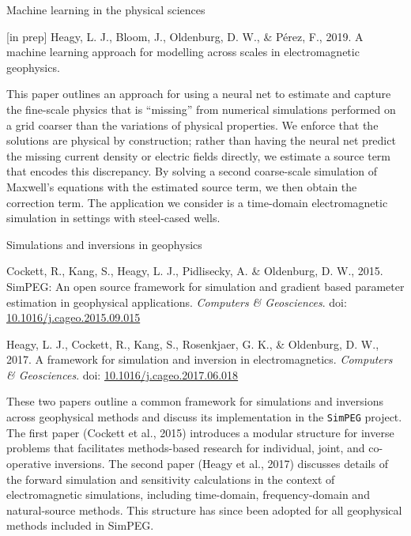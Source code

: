 \documentclass[a4paper, 11pt]{article}
\newcommand{\doi}[1]{doi: \href{https://doi.org/#1}{#1}}
\newcommand{\subheading}[1]{
    \vspace{0.4cm}
    {\Large #1}\\
    \vspace{-0.2cm}
}
\begin{document}
\subheading{Machine learning in the physical sciences}

\begin{myitemize}
    \item{[in prep] Heagy, L. J., Bloom, J., Oldenburg, D. W., \& P\'erez, F., 2019. A machine learning approach for modelling across scales in electromagnetic geophysics.}
\end{myitemize}

This paper outlines an approach for using a neural net to estimate and capture the fine-scale physics that is ``missing'' from numerical simulations performed on a grid coarser than the variations of physical properties.
We enforce that the solutions are physical by construction; rather than having the neural net predict the missing current density or electric fields directly, we estimate a source term that encodes this discrepancy.  By solving a second coarse-scale simulation of Maxwell's equations with the estimated source term, we then obtain the correction term.
The application we consider is a time-domain electromagnetic simulation in settings with steel-cased wells.


\subheading{Simulations and inversions in geophysics}

\begin{myitemize}
    \item Cockett, R., Kang, S., Heagy, L. J., Pidlisecky, A. \& Oldenburg, D. W., 2015. SimPEG: An open source framework for simulation and gradient based parameter estimation in geophysical applications. \emph{Computers \& Geosciences}. \doi{10.1016/j.cageo.2015.09.015}
    \item Heagy, L. J., Cockett, R., Kang, S., Rosenkjaer, G. K., \& Oldenburg, D. W., 2017. A framework for simulation and inversion in electromagnetics. \emph{Computers \& Geosciences}. \linebreak \doi{10.1016/j.cageo.2017.06.018}
\end{myitemize}

These two papers outline a common framework for simulations and inversions across geophysical methods and discuss its implementation in the \texttt{SimPEG} project. The first paper (Cockett et al., 2015) introduces a modular structure for inverse problems that facilitates methods-based research for individual, joint, and co-operative inversions.
The second paper (Heagy et al., 2017) discusses details of the forward simulation and sensitivity calculations in the context of electromagnetic simulations, including time-domain, frequency-domain and natural-source methods. This structure has since been adopted for all geophysical methods included in SimPEG.
\end{document}
